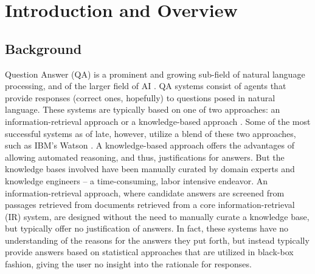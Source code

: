  
\chapter{Introduction and Overview}


\section{Background}
Question Answer (QA) \cite{martin_2000_speech_ch23, radev2000ranking} is a prominent and growing sub-field of natural language processing, and of the larger field of AI \cite{russell_norvig_2010_ch1}.  QA systems \cite{radev2000ranking} consist of agents that provide responses (correct ones, hopefully) to questions posed in natural language. These systems are typically based on one of two approaches: an information-retrieval approach \cite{manning_2008_introduction_ch1,manning_2008_introduction_ch2,manning_2008_introduction_ch4,manning_2008_introduction_ch6} or a knowledge-based approach \cite{brachman_2004_knowledge_ch3,brachman_2004_knowledge_ch4,brachman_2004_knowledge_ch5}.  Some of the most successful systems as of late, however, utilize a blend of these two approaches, such as IBM's Watson \cite{ferrucci2010building}.  A knowledge-based approach offers the advantages of allowing automated reasoning, and thus, justifications for answers.  But the knowledge bases involved have been manually curated by domain experts and knowledge engineers -- a time-consuming, labor intensive endeavor.  An information-retrieval approach, where candidate answers are screened from passages retrieved from documents retrieved from a core information-retrieval (IR) system, are designed without the need to manually curate a knowledge base, but typically offer no justification of answers.  In fact, these systems have no understanding of the reasons for the answers they put forth, but instead typically provide answers based on statistical approaches that are utilized in black-box fashion, giving the user no insight into the rationale for responses.



